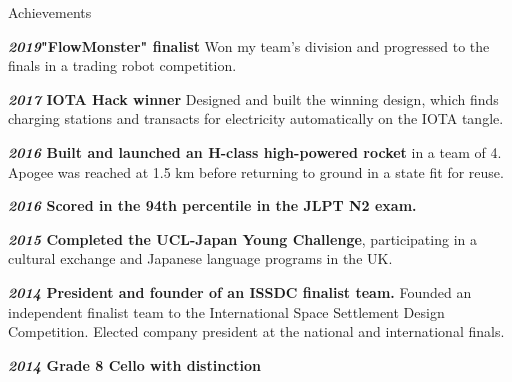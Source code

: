 \documentclass[10pt]{resume} %
\begin{document}
\begin{rSection}{Achievements}
    \item \textbf{\textit{2019}{"FlowMonster" finalist}} Won my team's division
      and progressed to the finals in a trading robot competition.
    \item \textbf{\textit{2017} IOTA Hack winner}
    Designed and built the winning design, which finds charging stations and
    transacts for electricity automatically on the IOTA tangle.
    \item \textbf{\textit{2016} Built and launched an H-class high-powered
      rocket} in a team of 4. Apogee was reached at 1.5 km before returning to
      ground in a state fit for reuse.
    \item \textbf{\textit{2016} Scored in the 94th percentile in the JLPT N2
      exam.}
    \item \textbf{\textit{2015} Completed the UCL-Japan Young Challenge},
    participating in a cultural exchange and Japanese language programs in the
    UK.
    \item \textbf{\textit{2014} President and founder of an ISSDC finalist
      team.}
    Founded an independent finalist team to the International Space Settlement
    Design Competition. Elected company president at the national and
    international finals.
     \item \textbf{\textit{2014} Grade 8 Cello with distinction}
\end{rSection}

\end{document}
